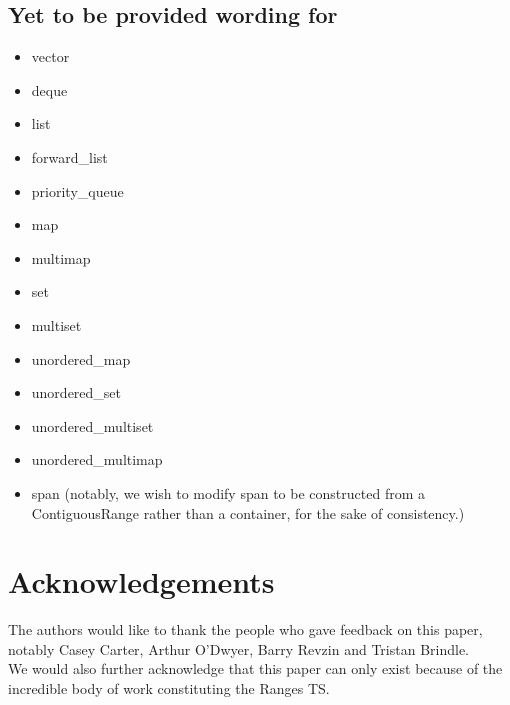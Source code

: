 \documentclass{wg21}
\begin{document}
\subsection{Yet to be provided wording for}

\begin{itemize}
	\item vector
	\item deque
	\item list
	\item forward_list
	\item priority_queue
	\item map
	\item multimap
	\item set
	\item multiset
	\item unordered_map
	\item unordered_set
	\item unordered_multiset
	\item unordered_multimap
	\item span (notably, we wish to modify span to be constructed from a ContiguousRange rather than a container, for the sake of consistency.)
\end{itemize}

\section{Acknowledgements}
The authors would like to thank the people who gave feedback on this paper, notably Casey Carter, Arthur O'Dwyer, Barry Revzin
and Tristan Brindle.\\
We would also further acknowledge that this paper can only exist because of the incredible body of work constituting the Ranges TS.
\end{document}

